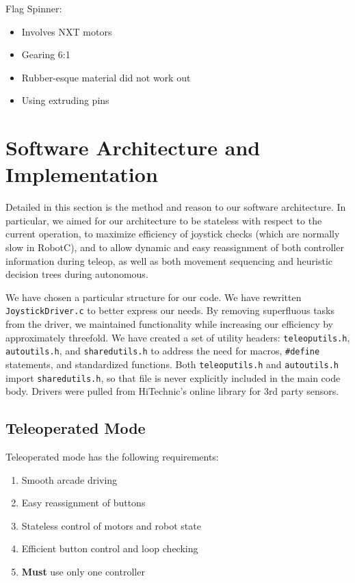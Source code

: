 \documentclass{article}
\begin{document}
Flag Spinner:
\begin{itemize}
\item Involves NXT motors
\item Gearing 6:1
\item Rubber-esque material did not work out
\item Using extruding pins
\end{itemize}

\newpage
\section{Software Architecture and Implementation}
Detailed in this section is the method and reason to our software architecture. In particular, we aimed for our architecture to be stateless with respect to the current operation, to maximize efficiency of joystick checks (which are normally slow in RobotC), and to allow dynamic and easy reassignment of both controller information during teleop, as well as both movement sequencing and heuristic decision trees during autonomous.

We have chosen a particular structure for our code. We have rewritten \lstinline{JoystickDriver.c}{} to better express our needs. By removing superfluous tasks from the driver, we maintained functionality while increasing our efficiency by approximately threefold. We have created a set of utility headers: \lstinline{teleoputils.h}{}, \lstinline{autoutils.h}{}, and \lstinline{sharedutils.h}{} to address the need for macros, \lstinline{#define}{} statements, and standardized functions. Both \lstinline{teleoputils.h}{} and \lstinline{autoutils.h}{} import \lstinline{sharedutils.h}{}, so that file is never explicitly included in the main code body. Drivers were pulled from HiTechnic's online library for 3rd party sensors.

\subsection{Teleoperated Mode}

Teleoperated mode has the following requirements: \begin{enumerate}
	\item{Smooth arcade driving}
	\item{Easy reassignment of buttons}
	\item{Stateless control of motors and robot state}
	\item{Efficient button control and loop checking}
	\item{\textbf{Must} use only one controller}
\end{enumerate}
\end{document}
